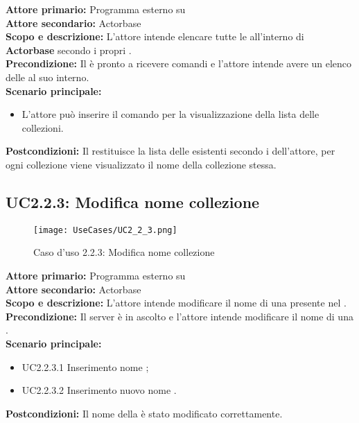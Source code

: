 \documentclass{scalatekids-article}
\begin{document}
\textbf{Attore primario:} Programma esterno su \\
\textbf{Attore secondario:} Actorbase\\
\textbf{Scopo e descrizione:} L'attore intende elencare tutte le  all'interno di \textbf{Actorbase} secondo i propri .\\
\textbf{Precondizione:} Il  è pronto a ricevere comandi e l'attore intende avere un elenco delle  al suo interno.\\
\textbf{Scenario principale:}
\begin{itemize}
\item L'attore può inserire il comando per la visualizzazione della lista delle collezioni.
\end{itemize}
\textbf{Postcondizioni:} Il  restituisce la lista delle  esistenti secondo i  dell'attore, per ogni collezione viene visualizzato il nome della collezione stessa.

\subsection{UC2.2.3: Modifica nome collezione}

\begin{figure}[H]
  \begin{center}
    \texttt{[image: UseCases/UC2\_2\_3.png]}
    \caption{Caso d'uso 2.2.3: Modifica nome collezione}
  \end{center}
\end{figure}
\textbf{Attore primario:} Programma esterno su \\
\textbf{Attore secondario:} Actorbase\\
\textbf{Scopo e descrizione:} L'attore intende modificare il nome di una  presente nel .\\
\textbf{Precondizione:} Il server è in ascolto e l’attore intende modificare il nome di una .\\
\textbf{Scenario principale:}
\begin{itemize}
\item UC2.2.3.1 Inserimento nome ;
\item UC2.2.3.2 Inserimento nuovo nome .
\end{itemize}
\textbf{Postcondizioni:} Il nome della  è stato modificato correttamente.
\end{document}
